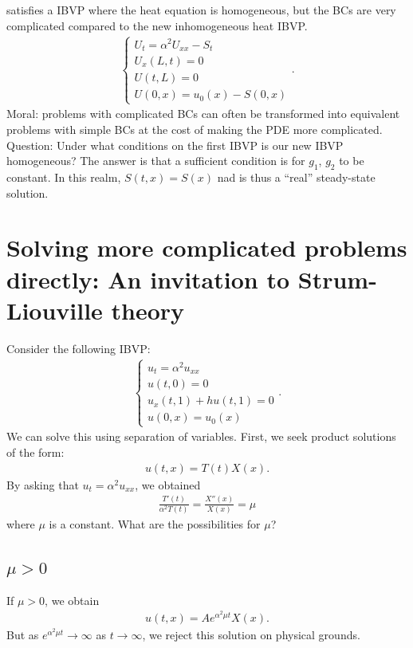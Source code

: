 \documentclass{article}
\theoremstyle{definition}
\begin{document}
satisfies a IBVP where the heat equation is homogeneous, but the BCs are very complicated compared to the new inhomogeneous heat IBVP. 
\begin{align*}
\begin{cases}
U_t = \alpha^2 U_{xx} - S_t\\
U_x(L,t) = 0\\
U(t,L) = 0\\
U(0,x) = u_0(x) - S(0,x)
\end{cases}.
\end{align*}
Moral: problems with complicated BCs can often be transformed into equivalent problems with simple BCs at the cost of making the PDE more complicated. \\

Question: Under what conditions on the first IBVP is our new IBVP homogeneous? The answer is that a sufficient condition is for $g_1$, $g_2$ to be constant. In this realm, $S(t,x) = S(x)$ nad is thus a ``real'' steady-state solution.

\newpage

\section{Solving more complicated problems directly: An invitation to Strum-Liouville theory}

Consider the following IBVP:
\begin{align*}
\begin{cases}
u_t = \alpha^2 u_{xx}\\
u(t,0) = 0\\
u_x(t,1) + hu(t,1) = 0\\
u(0,x) = u_0(x) 
\end{cases}.
\end{align*}
We can solve this using separation of variables. First, we seek product solutions of the form:
\begin{align*}
u(t,x) = T(t)X(x).
\end{align*}
By asking that $u_t = \alpha^2 u_{xx}$, we obtained 
\begin{align*}
\frac{T'(t)}{\alpha^2 T(t)} = \frac{X''(x)}{X(x)} = \mu
\end{align*}
where $\mu$ is a constant. What are the possibilities for $\mu$?\\

\subsection{$\mu > 0$}
If $\mu>0$, we obtain
\begin{align*}
u(t,x) = Ae^{\alpha^2 \mu t}X(x).
\end{align*}
But as $e^{\alpha^2 \mu t} \to \infty$ as $t\to\infty$, we reject this solution on physical grounds. \\
\end{document}
